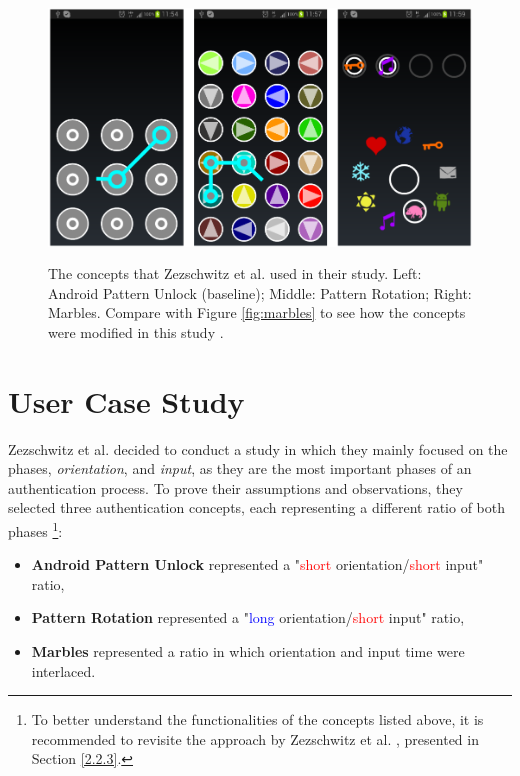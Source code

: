 \begin{figure}[t!]
\centering
\includegraphics[width=14cm, height=7cm]{Chapters/graphics/androidPatternMarble.PNG}
\caption{The concepts that Zezschwitz et al. \cite{Zezschwitz} used in their study. Left: Android Pattern Unlock (baseline); Middle: Pattern Rotation; Right: Marbles. Compare with Figure \ref{fig:marbles} to see how the concepts were modified in this study \cite{Zezschwitz}.}
\label{fig:android}
\end{figure}

\section{User Case Study}

Zezschwitz et al. \cite{Zezschwitz} decided to conduct a study in which they mainly focused on the phases, \textit{orientation}, and \textit{input}, as they are the most important phases of an authentication process. To prove their assumptions and observations, they selected three authentication concepts, each representing a different ratio of both phases \cite{Zezschwitz}\footnote{To better understand the functionalities of the concepts listed above, it is recommended to revisite the approach by Zezschwitz et al. \cite{Marbles}, presented in Section \ref{2.2.3}.}: 

\begin{itemize}
    \item \textbf{Android Pattern Unlock} represented a "\textcolor{red}{short} orientation/\textcolor{red}{short} input" ratio,
    \item \textbf{Pattern Rotation} represented a "\textcolor{blue}{long} orientation/\textcolor{red}{short} input" ratio,
    \item \textbf{Marbles} represented a ratio in which orientation and input time were interlaced.
\end{itemize}

